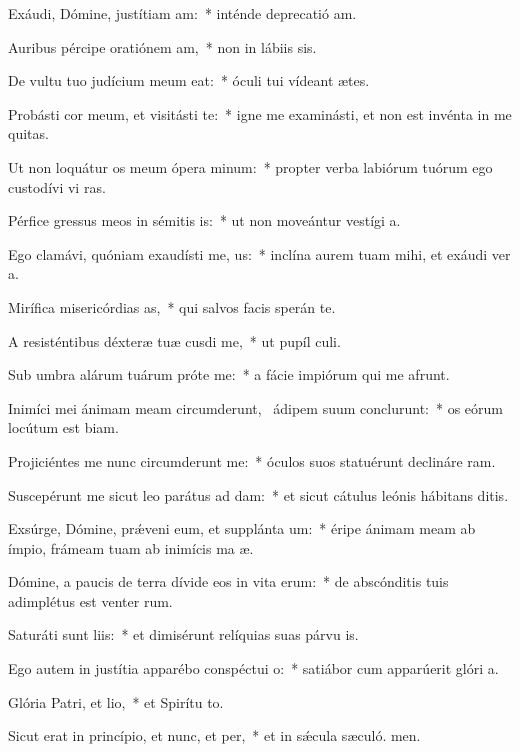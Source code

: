 \item Exáudi, Dómine, justítiam am:~* inténde deprecatió am.
\item Auribus pércipe oratiónem am,~* non in lábiis sis.
\item De vultu tuo judícium meum eat:~* óculi tui vídeant ætes.
\item Probásti cor meum, et visitásti te:~* igne me examinásti, et non est invénta in me quitas.
\item Ut non loquátur os meum ópera minum:~* propter verba labiórum tuórum ego custodívi vi ras.
\item Pérfice gressus meos in sémitis is:~* ut non moveántur vestígi a.
\item Ego clamávi, quóniam exaudísti me, us:~* inclína aurem tuam mihi, et exáudi ver a.
\item Mirífica misericórdias as,~* qui salvos facis sperán  te.
\item A resisténtibus déxteræ tuæ cusdi me,~* ut pupíl culi.
\item Sub umbra alárum tuárum próte me:~* a fácie impiórum qui me afrunt.
\item Inimíci mei ánimam meam circumderunt,~\pscross{} ádipem suum conclurunt:~* os eórum locútum est biam.
\item Projiciéntes me nunc circumderunt me:~* óculos suos statuérunt declináre  ram.
\item Suscepérunt me sicut leo parátus ad dam:~* et sicut cátulus leónis hábitans  ditis.
\item Exsúrge, Dómine, prǽveni eum, et supplánta um:~* éripe ánimam meam ab ímpio, frámeam tuam ab inimícis ma æ.
\item Dómine, a paucis de terra dívide eos in vita erum:~* de abscónditis tuis adimplétus est venter rum.
\item Saturáti sunt liis:~* et dimisérunt relíquias suas párvu is.
\item Ego autem in justítia apparébo conspéctui o:~* satiábor cum apparúerit glóri a.
\item Glória Patri, et lio,~* et Spirítu to.
\item Sicut erat in princípio, et nunc, et per,~* et in sǽcula sæculó. men.
